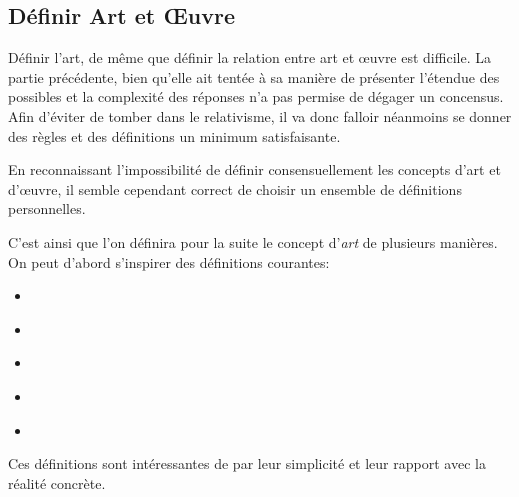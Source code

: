 \documentclass[12pt]{article} %
\begin{document}
\subsection{Définir Art et Œuvre}
Définir l'art, de même que définir la relation entre art et œuvre est difficile. La partie précédente, bien qu'elle ait tentée à sa manière de présenter l'étendue des possibles et la complexité des réponses n'a pas permise de dégager un concensus. Afin d'éviter de tomber dans le relativisme, il va donc falloir néanmoins se donner des règles et des définitions un minimum satisfaisante. 

En reconnaissant l'impossibilité de définir consensuellement les concepts d'art et d'œuvre, il semble cependant correct de choisir un ensemble de définitions personnelles.

C'est ainsi que l'on définira pour la suite le concept d'\textit{art} de plusieurs manières. On peut d'abord s'inspirer des définitions courantes:
\begin{itemize}
    \item {} \cite{WiktionnaireFr-art}
    \item {} \cite{WiktionnaireFr-art}
    \item {} \cite{LarousseOnline-art}
    \item {} \cite{LarousseOnline-art}
    \item {} \cite{LarousseOnline-art}
\end{itemize}
Ces définitions sont intéressantes de par leur simplicité et leur rapport avec la réalité concrète. 
\end{document}
